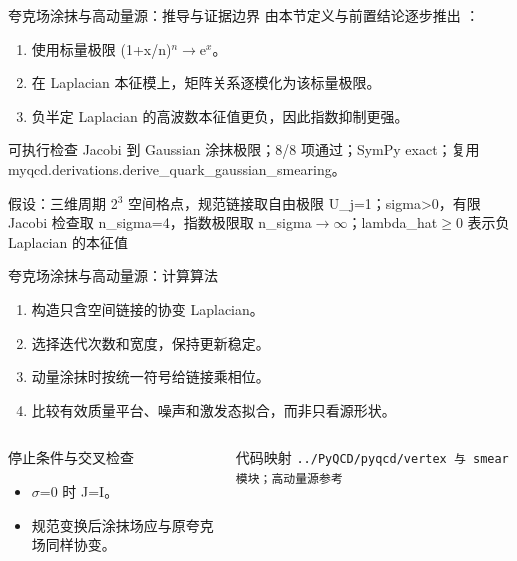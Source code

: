 \begin{frame}[t]{夸克场涂抹与高动量源：推导与证据边界}
\footnotesize
{}\quad 由本节定义与前置结论逐步推出 ：
\begin{enumerate}
\item 使用标量极限 (1+x/\allowbreak{}n)\ensuremath{^{n}}\ensuremath{\rightarrow}e\ensuremath{^{x}}。
\item 在 Laplacian 本征模上，矩阵关系逐模化为该标量极限。
\item 负半定 Laplacian 的高波数本征值更负，因此指数抑制更强。
\end{enumerate}\begin{block}{可执行检查}
\quad Jacobi 到 Gaussian 涂抹极限；8/8 项通过；SymPy exact；复用 myqcd.derivations.derive\_quark\_gaussian\_smearing。
\par\scriptsize 假设：三维周期 2\ensuremath{^{3}} 空间格点，规范链接取自由极限 U\_j=1；sigma>0，有限 Jacobi 检查取 n\_sigma=4，指数极限取 n\_sigma\ensuremath{\rightarrow}\ensuremath{\infty}；lambda\_hat\ensuremath{\ge}0 表示负 Laplacian 的本征值
\end{block}
\end{frame}

\begin{frame}[t]{夸克场涂抹与高动量源：计算算法}
\footnotesize
{}\begin{enumerate}
\item 构造只含空间链接的协变 Laplacian。
\item 选择迭代次数和宽度，保持更新稳定。
\item 动量涂抹时按统一符号给链接乘相位。
\item 比较有效质量平台、噪声和激发态拟合，而非只看源形状。
\end{enumerate}\begin{columns}[T,onlytextwidth]
\begin{block}{停止条件与交叉检查}\scriptsize\begin{itemize}
\item[\CheckMark] \ensuremath{\sigma}=0 时 J=I。
\item[\CheckMark] 规范变换后涂抹场应与原夸克场同样协变。
\end{itemize}\end{block}
\begin{block}{代码映射}
\scriptsize \texttt{.\allowbreak{}.\allowbreak{}/\allowbreak{}PyQCD/\allowbreak{}pyqcd/\allowbreak{}vertex 与 smear 模块；高动量源参考}
\end{block}\end{columns}\end{frame}

